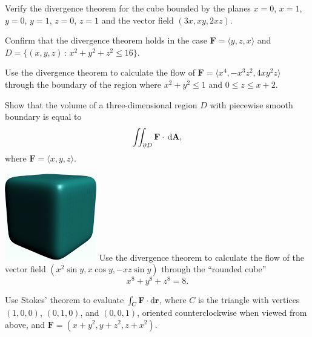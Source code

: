 \documentclass[prettycode,shellescape]{watsonbook}
\begin{document}

\begin{aexercise}
  Verify the divergence theorem for the cube bounded by the planes
  $x=0$, $x=1$, $y=0$, $y=1$, $z=0$, $z=1$ and the vector field
  $(3x,xy,2xz)$.
\end{aexercise}

\begin{aexercise}
  Confirm that the divergence theorem holds in the case $\mathbf{F} =
  \langle y, z, x \rangle$ and $D = \{(x,y,z) \,: \, x^2 + y^2 + z^2
  \leq 16\}$. 
\end{aexercise}

\begin{aexercise}
  Use the divergence theorem to calculate the flow of $\mathbf{F} =
  \langle x^4, -x^3 z^2, 4xy^2 z \rangle$ through the boundary of the
  region where $x^2 + y^2 \leq 1$ and $0 \leq z
  \leq x + 2$. 
\end{aexercise}

\begin{aexercise}
  Show that the volume of a three-dimensional region $D$ with
  piecewise smooth boundary is equal to 
  \[
    \iint_{\partial D} \mathbf{F} \cdot \, {\mathrm{d}}\mathbf{A},
  \]
  where $\mathbf{F} =\langle x, y, z \rangle$. 
\end{aexercise}

\begin{aexercise}
  \begin{insetfigure}{\includegraphics[width=4cm]{exercisefigures/roundedcube}}
    Use the divergence theorem to calculate the flow of the vector
    field $(x^2 \sin y, x \cos y, -xz \sin y)$ through the ``rounded
    cube'' \[x^8 + y^8 + z^8 = 8.\]
  \end{insetfigure}
\end{aexercise}


\begin{aexercise}
  Use Stokes' theorem to evaluate
  $\int_C\mathbf{F} \cdot \mathrm{d}\mathbf{r}$, where $C$ is the triangle
  with vertices $(1,0,0)$, $(0,1,0)$, and $(0,0,1)$, oriented
  counterclockwise when viewed from above, and
  $\mathbf{F} = (x+y^2,y+z^2,z+x^2)$.
\end{aexercise}
\end{document}
